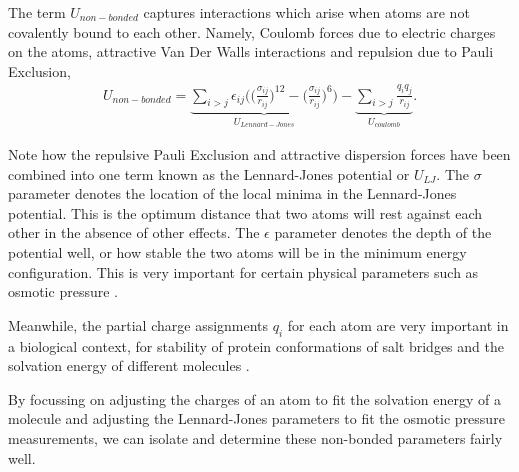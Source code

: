 The term $U_{non-bonded}$ captures interactions which arise when atoms are not covalently bound to each other. Namely, Coulomb forces due to electric charges on the atoms, attractive Van Der Walls interactions and repulsion due to Pauli Exclusion,
\begin{equation}\label{nonbonded_eqs}
	\begin{aligned}
		U_{non-bonded} = \underbrace{\sum_{i>j} \epsilon_{ij} \Big( \Big(\frac{\sigma_{ij}}{r_{ij}}\Big)^{12} - \Big(\frac{\sigma_{ij}}{r_{ij}}\Big)^{6} \Big)}_{U_{Lennard-Jones}} - \underbrace{\sum_{i>j} \frac{q_i q_j } {r_{ij}}}_{U_{coulomb}}. 
	\end{aligned}
\end{equation}

Note how the repulsive Pauli Exclusion and attractive dispersion forces have been combined into one term known as the Lennard-Jones potential or $U_{LJ}$. The $\sigma$ parameter denotes the location of the local minima in the Lennard-Jones potential. This is the optimum distance that two atoms will rest against each other in the absence of other effects. The $\epsilon$ parameter denotes the depth of the potential well, or how stable the two atoms will be in the minimum energy configuration. This is very important for certain physical parameters such as osmotic pressure \cite{yoo2018a}.

Meanwhile, the partial charge assignments $q_i$ for each atom are very important in a biological context, for stability of protein conformations of salt bridges and the solvation energy of different molecules \cite{jambeck2013}.

By focussing on adjusting the charges of an atom to fit the solvation energy of a molecule and adjusting the Lennard-Jones parameters to fit the osmotic pressure measurements, we  can isolate and determine these non-bonded parameters fairly well.

